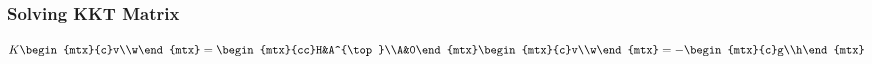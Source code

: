 \subsubsection*{Solving KKT Matrix}
\begin{equation}
    K\begin{mtx}{c}v\\w\end{mtx}=\begin{mtx}{cc}H&A^{\top}\\A&0\end{mtx}\begin{mtx}{c}v\\w\end{mtx}=-\begin{mtx}{c}g\\h\end{mtx}
\end{equation}
